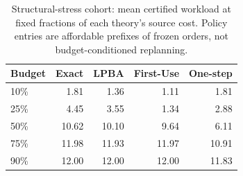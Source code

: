 \begin{table}[H]
\caption{Structural-stress cohort: mean certified workload at fixed fractions of each theory's source cost. Policy entries are affordable prefixes of frozen orders, not budget-conditioned replanning.\label{tab:budget}}
\centering\small\renewcommand{\arraystretch}{1.08}
\begin{tabular}{lrrrr}
\toprule
Budget & Exact & LPBA & First-Use & One-step \\
\midrule
10\% & 1.81 & 1.36 & 1.11 & 1.81 \\
25\% & 4.45 & 3.55 & 1.34 & 2.88 \\
50\% & 10.62 & 10.10 & 9.64 & 6.11 \\
75\% & 11.98 & 11.93 & 11.97 & 10.91 \\
90\% & 12.00 & 12.00 & 12.00 & 11.83 \\
\bottomrule
\end{tabular}
\end{table}
